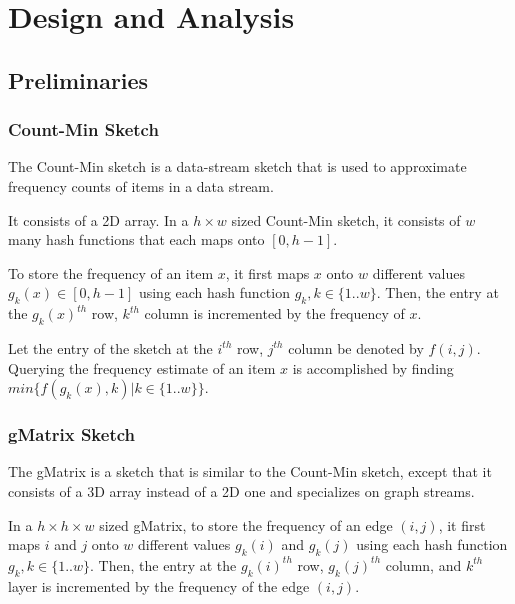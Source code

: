 
\chapter{Design and Analysis}

\ifpdf
    \graphicspath{{Chapter2/Figs/Raster/}{Chapter2/Figs/PDF/}{Chapter2/Figs/}}
\else
    \graphicspath{{Chapter2/Figs/Vector/}{Chapter2/Figs/}}
\fi


\section{Preliminaries}

\subsection{Count-Min Sketch}
The Count-Min \cite{cormode2005improved} sketch is a data-stream sketch that is used to approximate frequency counts of items in a data stream.

It consists of a 2D array. In a $h \times w$ sized Count-Min sketch, it consists of $w$ many hash functions that each maps onto $[0,h-1]$.

To store the frequency of an item $x$, it first maps $x$ onto $w$ different values $g_k(x) \in [0,h-1]$ using each hash function $g_k, k \in \{1..w\}$. Then, the entry at the $g_k(x)^{th}$ row, $k^{th}$ column is incremented by the frequency of $x$.

Let the entry of the sketch at the $i^{th}$ row, $j^{th}$ column be denoted by $f(i,j)$. Querying the frequency estimate of an item $x$ is accomplished by finding $min\{f(g_k(x),k)|k \in \{1..w\}\}$.

\subsection{gMatrix Sketch}
The gMatrix \cite{khan} is a sketch that is similar to the Count-Min sketch, except that it consists of a 3D array instead of a 2D one and specializes on graph streams.

In a $h \times h \times w$ sized gMatrix, to store the frequency of an edge $(i,j)$, it first maps $i$ and $j$ onto $w$ different values $g_k(i)$ and $g_k(j)$ using each hash function $g_k, k \in \{1..w\}$. Then, the entry at the $g_k(i)^{th}$ row, $g_k(j)^{th}$ column, and $k^{th}$ layer is incremented by the frequency of the edge $(i,j)$.

